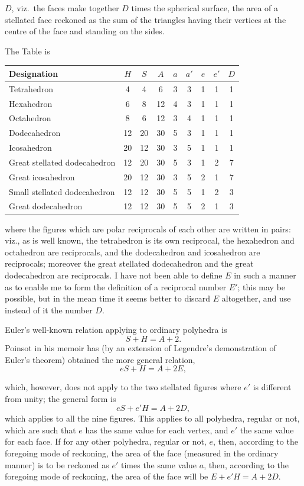 \documentclass[11pt,a4paper]{article}
\begin{document}
$D$, viz.\ the faces make together $D$ times the spherical surface, the area of a stellated face reckoned as the sum of the triangles having their vertices at the centre of the face and standing on the sides.

The Table is

\begin{center}
\begin{tabular}{lcccccccc}
\toprule
Designation & $H$ & $S$ & $A$ & $a$ & $a'$ & $e$ & $e'$ & $D$ \\
\midrule
Tetrahedron      & 4  & 4  & 6  & 3 & 3 & 1 & 1 & 1 \\
Hexahedron       & 6  & 8  & 12 & 4 & 3 & 1 & 1 & 1 \\
Octahedron       & 8  & 6  & 12 & 3 & 4 & 1 & 1 & 1 \\
Dodecahedron     & 12 & 20 & 30 & 5 & 3 & 1 & 1 & 1 \\
Icosahedron      & 20 & 12 & 30 & 3 & 5 & 1 & 1 & 1 \\
\midrule
Great stellated dodecahedron     & 12 & 20 & 30 & 5 & 3 & 1 & 2 & 7 \\
Great icosahedron                & 20 & 12 & 30 & 3 & 5 & 2 & 1 & 7 \\
Small stellated dodecahedron     & 12 & 12 & 30 & 5 & 5 & 1 & 2 & 3 \\
Great dodecahedron               & 12 & 12 & 30 & 5 & 5 & 2 & 1 & 3 \\
\bottomrule
\end{tabular}
\end{center}

where the figures which are polar reciprocals of each other are written in pairs: viz., as is well known, the tetrahedron is its own reciprocal, the hexahedron and octahedron are reciprocals, and the dodecahedron and icosahedron are reciprocals; moreover the great stellated dodecahedron and the great dodecahedron are reciprocals. I have not been able to define $E$ in such a manner as to enable me to form the definition of a reciprocal number $E'$; this may be possible, but in the mean time it seems better to discard $E$ altogether, and use instead of it the number $D$.

Euler's well-known relation applying to ordinary polyhedra is
\[
S + H = A + 2.
\]
Poinsot in his memoir has (by an extension of Legendre's demonstration of Euler's theorem) obtained the more general relation,
\[
eS + H = A + 2E,
\]

\setcounter{page}{85}

which, however, does not apply to the two stellated figures where $e'$ is different from unity; the general form is
\[
eS + e'H = A + 2D,
\]
which applies to all the nine figures. This applies to all polyhedra, regular or not, which are such that $e$ has the same value for each vertex, and $e'$ the same value for each face. If for any other polyhedra, regular or not, $e$, then, according to the foregoing mode of reckoning, the area of the face (measured in the ordinary manner) is to be reckoned as $e'$ times the same value $a$, then, according to the foregoing mode of reckoning, the area of the face will be $E + e'H = A + 2D$.
\end{document}
